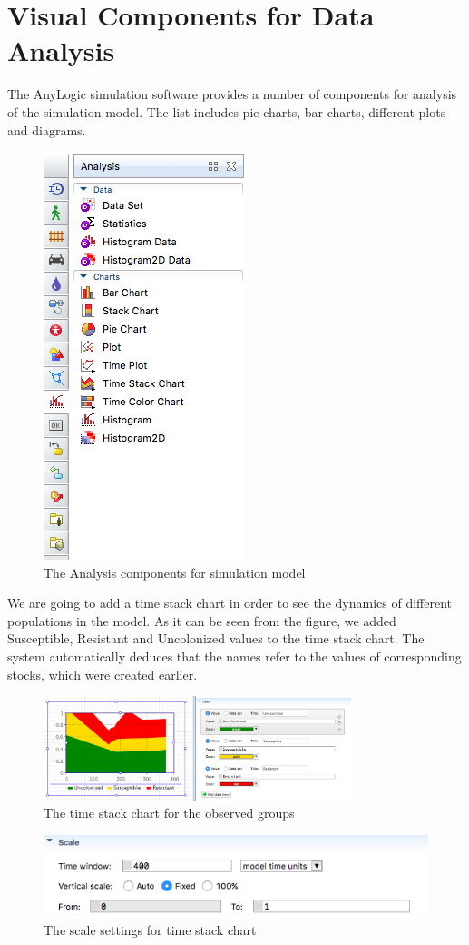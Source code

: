 \section{Visual Components for Data Analysis}

The AnyLogic simulation software provides a number of components for analysis of the simulation model. The list includes pie charts, bar charts, different plots and diagrams.

\begin{figure}[H]
  \centering
  \includegraphics[height=0.5\textwidth]{img/screens/charts/charts1}
  \caption{The Analysis components for simulation model}
\end{figure}

We are going to add a time stack chart in order to see the dynamics of different populations in the model. As it can be seen from the figure, we added Susceptible, Resistant and Uncolonized values to the time stack chart. The system automatically deduces that the names refer to the values of corresponding stocks, which were created earlier.

\begin{figure}[H]
  \centering
  \includegraphics[width=0.8\textwidth]{img/screens/charts/charts5}
  \caption{The time stack chart for the observed groups}
\end{figure}

\begin{figure}[H]
  \centering
  \includegraphics[height=0.2\textwidth]{img/screens/charts/charts3}
  \caption{The scale settings for time stack chart}
\end{figure}

